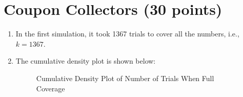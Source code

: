 \documentclass[11pt]{article}
\begin{document}
\newpage
\section{ Coupon Collectors (30 points)}

\begin{enumerate}[A]
\item In the first simulation, it took 1367 trials to cover all the numbers, i.e., $k = 1367$.
\item The cumulative density plot is shown below:
\begin{figure}[h]
\caption{Cumulative Density Plot of Number of Trials When Full Coverage}
\label{fig:name}
\end{figure}


\end{enumerate}
\end{document}
